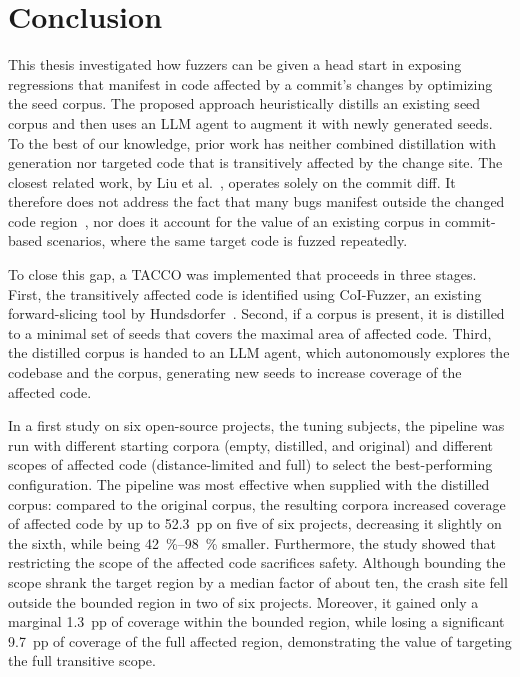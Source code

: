 
\chapter{Conclusion}\label{chapter:conclusion}

This thesis investigated how fuzzers can be given a head start in exposing regressions that manifest in code affected by a commit's changes by optimizing the seed corpus.
The proposed approach heuristically distills an existing seed corpus and then uses an \ac{LLM} agent to augment it with newly generated seeds.
To the best of our knowledge, prior work has neither combined distillation with generation nor targeted code that is transitively affected by the change site.
The closest related work, by Liu et al.~\cite{liuEvaluatingLLMBasedRegression2026}, operates solely on the commit diff.
It therefore does not address the fact that many bugs manifest outside the changed code region~\cite{zotero-item-324, xiangCriticalCodeGuided2024}, nor does it account for the value of an existing corpus in commit-based scenarios, where the same target code is fuzzed repeatedly.

To close this gap, a TACCO was implemented that proceeds in three stages.
First, the transitively affected code is identified using \ac{CoI}-Fuzzer, an existing forward-slicing tool by Hundsdorfer~\cite{zotero-item-324}.
Second, if a corpus is present, it is distilled to a minimal set of seeds that covers the maximal area of affected code.
Third, the distilled corpus is handed to an \ac{LLM} agent, which autonomously explores the codebase and the corpus, generating new seeds to increase coverage of the affected code.

In a first study on six open-source projects, the tuning subjects, the pipeline was run with different starting corpora (empty, distilled, and original) and different scopes of affected code (distance-limited and full) to select the best-performing configuration.
The pipeline was most effective when supplied with the distilled corpus: compared to the original corpus, the resulting corpora increased coverage of affected code by up to \SI{52.3}{pp} on five of six projects, decreasing it slightly on the sixth, while being \SIrange{42}{98}{\percent} smaller.
Furthermore, the study showed that restricting the scope of the affected code sacrifices safety.
Although bounding the scope shrank the target region by a median factor of about ten, the crash site fell outside the bounded region in two of six projects.
Moreover, it gained only a marginal \SI{1.3}{pp} of coverage within the bounded region, while losing a significant \SI{9.7}{pp} of coverage of the full affected region, demonstrating the value of targeting the full transitive scope.

